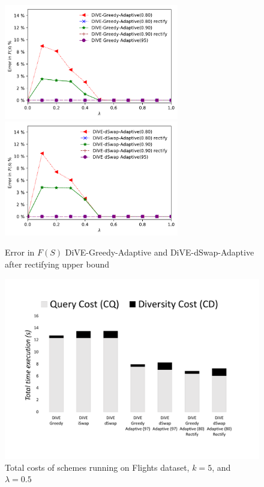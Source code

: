 \documentclass{article}
\begin{document}
\begin{figure}
	\begin{center}
		\includegraphics[width=3.0in]{figures/error_fs_rectifying_greedy}
		\includegraphics[width=3.0in]{figures/error_fs_rectifying_dswap}
		\caption{Error in $F(S)$ DiVE-Greedy-Adaptive and DiVE-dSwap-Adaptive after rectifying upper bound}
		\label{fig:error_fs_rectifying}
	\end{center}
\end{figure}





\begin{figure}
	\begin{center}
		\vspace{-50pt}
		\includegraphics[width=6in]{figures/flight_costs_rectifying}
		\caption{Total costs of schemes running on Flights dataset, $k = 5$, and $\lambda = 0.5$ }
		\label{fig:flight_costs_all_rectifying}
		\vspace{-10pt}
	\end{center}
\end{figure}
\end{document}
